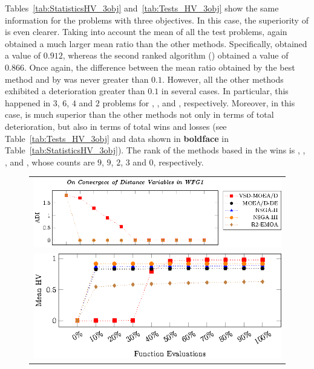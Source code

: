 Tables~\ref{tab:StatisticsHV_3obj} and~\ref{tab:Tests_HV_3obj} show the same information for the problems with three objectives.
%
In this case, the superiority of \VSDMOEAD{} is even clearer.
%
Taking into account the mean of all the test problems, \VSDMOEAD{} again obtained a much larger mean \HV{} ratio than the other methods.
%
Specifically, \VSDMOEAD{} obtained a value of $0.912$, whereas the second ranked algorithm (\RMOEA{}) obtained a value of $0.866$.
%
Once again, the difference between the mean \HV{} ratio obtained by the best method and by \VSDMOEAD{} was never greater than $0.1$.
%
However, all the other methods exhibited a deterioration greater than $0.1$ in several cases.
%
In particular, this happened in $3$, $6$, $4$ and $2$ problems for \RMOEA{}, \NSGAII{}, \NSGAIII{} and \MOEADDE{}, respectively.
%
Moreover, in this case, \VSDMOEAD{} is much superior than the other methods not only in terms of total deterioration, but also in terms of total wins and losses (see Table~\ref{tab:Tests_HV_3obj} and data shown in {\bf boldface} in Table~\ref{tab:StatisticsHV_3obj}).
%
The rank of the methods based in the wins is \VSDMOEAD{}, \RMOEA{}, \NSGAIII{}, \MOEADDE{} and \NSGAII{}, whose counts are $9$, $9$, $2$, $3$ and $0$, respectively.











\begin{figure}[t]
\centering
\begin{tabular}{l}
 \includegraphics[scale=0.8]{images/Diversity_Long_Term_tikz_WFG1-figure0.eps}\\[0cm]%
 \includegraphics[scale=0.8]{images/Diversity_Long_Term_tikz_WFG1-figure1.eps}\\[0cm]%
\end{tabular}
\end{figure}


